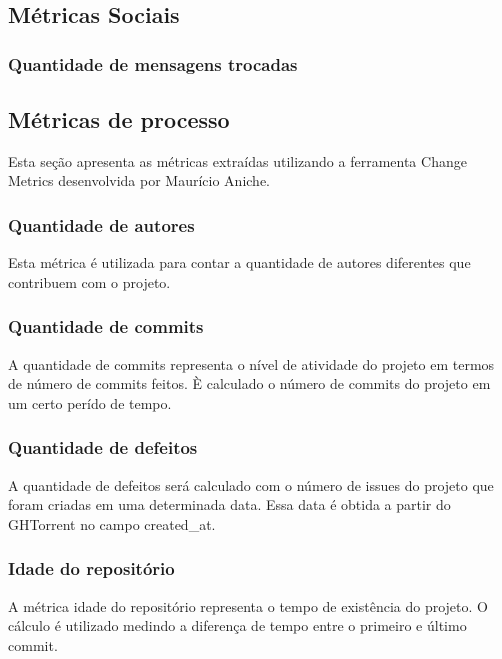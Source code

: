 \subsection{Métricas Sociais}
\subsubsection{Quantidade de mensagens trocadas}

\subsection{Métricas de processo}
Esta seção apresenta as métricas extraídas utilizando a ferramenta Change Metrics desenvolvida por Maurício Aniche.
\subsubsection{Quantidade de autores}
Esta métrica é utilizada para contar a quantidade de autores diferentes que contribuem com o projeto.
\subsubsection{Quantidade de commits}
A quantidade de commits representa o nível de atividade do projeto em termos de número de commits feitos. È calculado o número de commits do projeto em um certo perído de tempo. 
\subsubsection{Quantidade de defeitos}
A quantidade de defeitos será calculado com o número de issues do projeto que foram criadas em uma determinada data. Essa data é obtida a partir do GHTorrent no campo created\_at.
\subsubsection{Idade do repositório}
A métrica idade do repositório representa o tempo de existência do projeto. O cálculo é utilizado medindo a diferença de tempo entre o primeiro e último commit.